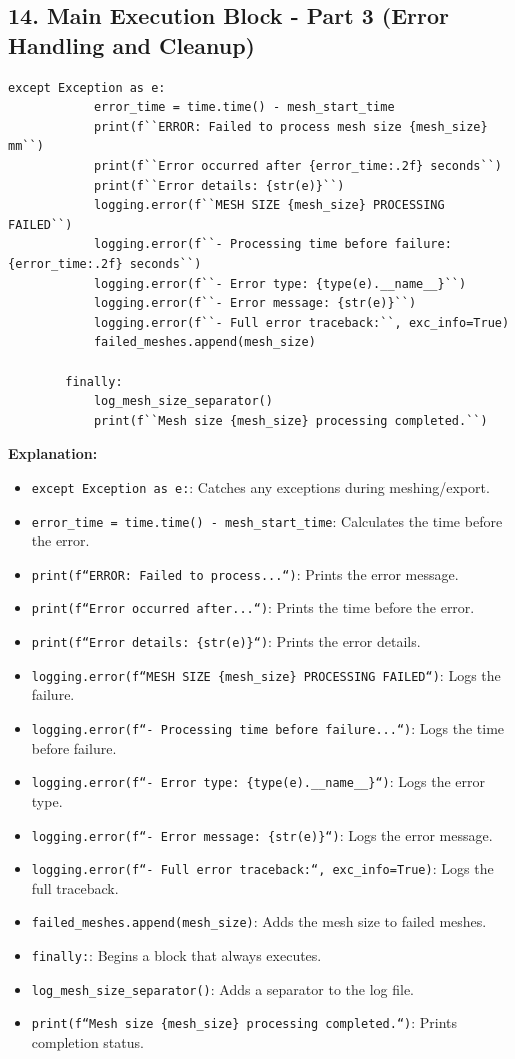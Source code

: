 \documentclass{book}
\begin{document}
\begin{itemize}[leftmargin=*,label=\textbullet]
\subsection*{14. Main Execution Block - Part 3 (Error Handling and Cleanup)}
\begin{lstlisting}[caption={Main Execution Block - Error Handling and Cleanup},label={lst:main_3}]
        except Exception as e:
            error_time = time.time() - mesh_start_time
            print(f``ERROR: Failed to process mesh size {mesh_size} mm``)
            print(f``Error occurred after {error_time:.2f} seconds``)
            print(f``Error details: {str(e)}``)
            logging.error(f``MESH SIZE {mesh_size} PROCESSING FAILED``)
            logging.error(f``- Processing time before failure: {error_time:.2f} seconds``)
            logging.error(f``- Error type: {type(e).__name__}``)
            logging.error(f``- Error message: {str(e)}``)
            logging.error(f``- Full error traceback:``, exc_info=True)
            failed_meshes.append(mesh_size)

        finally:
            log_mesh_size_separator()
            print(f``Mesh size {mesh_size} processing completed.``)
\end{lstlisting}
\textbf{Explanation:}
\begin{itemize}
    \item \texttt{except Exception as e:}: Catches any exceptions during meshing/export.
    \item \texttt{error\_time = time.time() - mesh\_start\_time}: Calculates the time before the error.
    \item \texttt{print(f``ERROR: Failed to process...``)}: Prints the error message.
    \item \texttt{print(f``Error occurred after...``)}: Prints the time before the error.
    \item \texttt{print(f``Error details: \{str(e)\}``)}: Prints the error details.
    \item \texttt{logging.error(f``MESH SIZE \{mesh\_size\} PROCESSING FAILED``)}: Logs the failure.
    \item \texttt{logging.error(f``- Processing time before failure...``)}: Logs the time before failure.
    \item \texttt{logging.error(f``- Error type: \{type(e).\_\_name\_\_\}``)}: Logs the error type.
    \item \texttt{logging.error(f``- Error message: \{str(e)\}``)}: Logs the error message.
    \item \texttt{logging.error(f``- Full error traceback:``, exc\_info=True)}: Logs the full traceback.
    \item \texttt{failed\_meshes.append(mesh\_size)}: Adds the mesh size to failed meshes.
    \item \texttt{finally:}: Begins a block that always executes.
    \item \texttt{log\_mesh\_size\_separator()}: Adds a separator to the log file.
    \item \texttt{print(f``Mesh size \{mesh\_size\} processing completed.``)}: Prints completion status.
\end{itemize}


\end{itemize}
\end{document}
